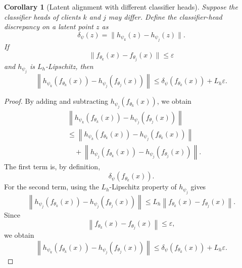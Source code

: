 \documentclass[conference]{IEEEtran}
\newtheorem{corollary}{Corollary}
\begin{document}
\begin{corollary}[Latent alignment with different classifier heads]
\label{cor:different_heads}
Suppose the classifier heads of clients $k$ and $j$ may differ. Define the classifier-head discrepancy on a latent point $z$ as
\begin{equation}
\delta_{\psi}(z)
=
\|h_{\psi_k}(z)-h_{\psi_j}(z)\|.
    \label{eq:auto-083}
\end{equation}
If
\begin{equation}
\|f_{\theta_k}(x)-f_{\theta_j}(x)\|
\leq
\varepsilon
    \label{eq:auto-084}
\end{equation}
and $h_{\psi_j}$ is $L_h$-Lipschitz, then
\begin{equation}
\left\|
h_{\psi_k}(f_{\theta_k}(x))
-
h_{\psi_j}(f_{\theta_j}(x))
\right\|
\leq
\delta_{\psi}(f_{\theta_k}(x))
+
L_h\varepsilon.
    \label{eq:auto-085}
\end{equation}
\end{corollary}

\begin{proof}
By adding and subtracting $h_{\psi_j}(f_{\theta_k}(x))$, we obtain
\begin{align}
&\left\|
 h_{\psi_k}(f_{\theta_k}(x))
 -h_{\psi_j}(f_{\theta_j}(x))
\right\| \\
&\leq
\left\|
 h_{\psi_k}(f_{\theta_k}(x))
 -h_{\psi_j}(f_{\theta_k}(x))
\right\| \\
&\quad+
\left\|
 h_{\psi_j}(f_{\theta_k}(x))
 -h_{\psi_j}(f_{\theta_j}(x))
\right\|.
\end{align}
The first term is, by definition,
\begin{equation}
\delta_{\psi}(f_{\theta_k}(x)).
    \label{eq:auto-086}
\end{equation}
For the second term, using the $L_h$-Lipschitz property of $h_{\psi_j}$ gives
\begin{equation}
\left\|
h_{\psi_j}(f_{\theta_k}(x))
-
h_{\psi_j}(f_{\theta_j}(x))
\right\|
\leq
L_h
\left\|
f_{\theta_k}(x)-f_{\theta_j}(x)
\right\|.
    \label{eq:auto-087}
\end{equation}
Since
\begin{equation}
\left\|
f_{\theta_k}(x)-f_{\theta_j}(x)
\right\|
\leq
\varepsilon,
    \label{eq:auto-088}
\end{equation}
we obtain
\begin{equation}
\left\|
h_{\psi_k}(f_{\theta_k}(x))
-
h_{\psi_j}(f_{\theta_j}(x))
\right\|
\leq
\delta_{\psi}(f_{\theta_k}(x))
+
L_h\varepsilon.
    \label{eq:auto-089}
\end{equation}
\end{proof}
\end{document}
